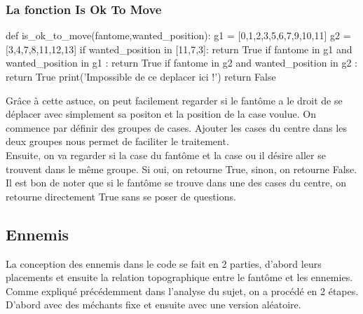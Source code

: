 \documentclass[titlepage]{report}
\begin{document}
\subsubsection{La fonction Is Ok To Move}
\begin{python}
def is_ok_to_move(fantome,wanted_position):
    g1 = [0,1,2,3,5,6,7,9,10,11]
    g2 = [3,4,7,8,11,12,13]
    if wanted_position in [11,7,3]:
        return True
    if fantome in g1 and wanted_position in g1 :
        return True
    if fantome in g2 and wanted_position in g2  :
        return True
    print('Impossible de ce deplacer ici !')
    return False
\end{python}
\vspace*{0.5cm}
\hspace*{0.5cm}Grâce à cette astuce, on peut facilement regarder si le fantôme a le droit de se déplacer avec simplement sa positon et la position de la case voulue. On commence par définir des groupes de cases. Ajouter les cases du centre dans les deux groupes nous permet de faciliter le traitement.\\
\hspace*{0.5cm}Ensuite, on va regarder si la case du fantôme et la case ou il désire aller se trouvent dans le même groupe. Si oui, on retourne True, sinon, on retourne False. Il est bon de noter que si le fantôme se trouve dans une des cases du centre, on retourne directement True sans se poser de questions. 

\subsection{Ennemis}
\hspace*{0.5cm} La conception des ennemis dans le code se fait en 2 parties, d'abord leurs placements et ensuite la relation topographique entre le fantôme et les ennemies.\\
\hspace*{0.5cm}Comme expliqué précédemment dans l'analyse du sujet, on a procédé en 2 étapes. D'abord avec des méchants fixe et ensuite avec une version aléatoire.\\

\begin{figure}[H]%
    \centering
\end{figure}
\end{document}
